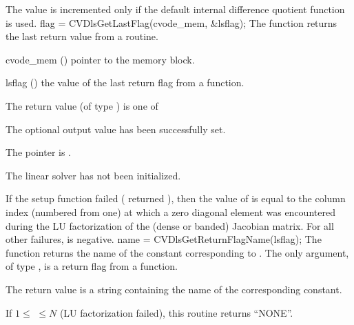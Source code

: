 {
  The value  is incremented only if the default 
  internal difference quotient function is used.
}
{
  flag = CVDlsGetLastFlag(cvode\_mem, \&lsflag);
}
{
  The function  returns the
  last return value from a {\cvdls} routine. 
}
{
  \begin{args}
  \item[cvode\_mem] ()
    pointer to the {\cvode} memory block.
  \item[lsflag] ()
    the value of the last return flag from a {\cvdls} function.
  \end{args}
}
{
  The return value  (of type ) is one of
  \begin{args}
  \item[\Id{CVDLS\_SUCCESS}] 
    The optional output value has been successfully set.
  \item[\Id{CVDLS\_MEM\_NULL}]
    The  pointer is .
  \item[\Id{CVDLS\_LMEM\_NULL}]
    The {\cvdls} linear solver has not been initialized.
  \end{args}
}
{
  If the {\cvdense} setup function failed ( returned ),
  then the value of  is equal to the column index (numbered from one)
  at which a zero diagonal element was encountered during the LU
  factorization of the (dense or banded) Jacobian matrix.  For all other
  failures,  is negative.
}
{
  name = CVDlsGetReturnFlagName(lsflag);
}
{
  The function  returns the
  name of the {\cvdls} constant corresponding to .
}
{
  The only argument, of type , is a return flag from a {\cvdls}
  function.
}
{
  The return value is a string containing the name of the corresponding constant.

  If $1 \leq $  $ \leq N$ (LU factorization failed), this routine
  returns ``NONE''.
}
{}


